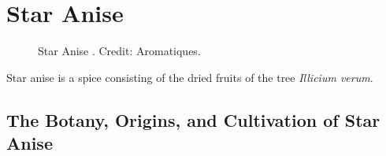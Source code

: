 \section{Star Anise}
\label{sec:star_anise}



\begin{figure}[!ht]
	\vspace{-4ex}
	\centering
	\hfill
	\hfill
	\caption{Star Anise . Credit: Aromatiques.}
	\label{fig:star_anise_imgs}
\end{figure}

Star anise is a spice consisting of the dried fruits of the tree \textit{Illicium verum}. 





\subsection{The Botany, Origins, and Cultivation of Star Anise}

